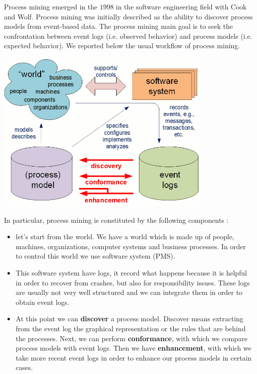 \documentclass[11pt]{article}
\begin{document}
Process mining emerged in the $1998$ in the software engineering field with Cook and Wolf. Process mining was initially described as the ability to discover process models from event-based data. The process mining main goal is to seek the confrontation between event logs (i.e. observed behavior) and process models (i.e. expected behavior). We reported below the usual workflow of process mining.

\begin{center}
\includegraphics[scale=0.5]{./images/process_mining_workflow.png}
\end{center}


In particular, process mining is constituted by the following components :

\begin{itemize}
\item let's start from the world. We have a world which is made up of people, machines, organizations, computer systems and business processes. In order to control this world we use software system (PMS).

\item This software system have logs, it record what happens because it is helpful in order to recover from crashes, but also for responsibility issues. These logs are usually not very well structured and we can integrate them in order to obtain event logs.

\item At this point we can \textbf{discover} a process model. Discover means extracting from the event log the graphical representation or the rules that are behind the processes. Next, we can perform \textbf{conformance}, with which we compare process models with event logs. Then we have \textbf{enhancement}, with which we take more recent event logs in order to enhance our process models in certain cases.
\end{itemize}
\end{document}
